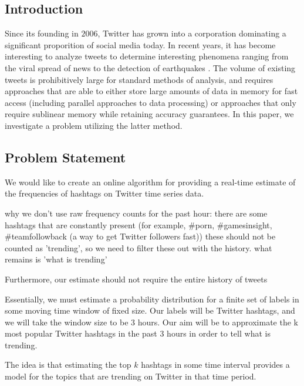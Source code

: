 \documentclass[twoside]{article}
\newcommand{\cc}[1]
 {\textbf{\cite{#1}}}
\begin{document}
\begin{multicols}{2} %

\section{Introduction} \label{sec:Intro}

Since its founding in $2006$, Twitter has grown into a corporation dominating a significant
proporition of social media today. In recent years, it has become interesting to analyze tweets
to determine interesting phenomena ranging from the viral spread of news to the detection of earthquakes \cc{Burks:2014}. The volume of existing tweets is prohibitively large for standard methods of analysis, and requires approaches that are able to either store large amounts of data in memory for fast access (including parallel approaches to data processing) or approaches that only require sublinear memory while retaining accuracy guarantees. In this paper, we investigate a problem utilizing the latter method. 

\subsection{Problem Statement} 

We would like to create an online algorithm for providing a real-time estimate of the frequencies of hashtags on Twitter time series data.

why we don't use raw frequency counts for the past hour:
there are some hashtags that are constantly present (for example, #porn, #gamesinsight, #teamfollowback (a way to get Twitter followers fast))
these should not be counted as 'trending', so we need to filter these out
with the history. what remains is 'what is trending'

Furthermore, our estimate should not require the entire history of tweets 

Essentially, we must estimate a probability distribution for a finite set of labels in some moving time window of fixed size. Our labels will be Twitter hashtags, and we will take the window size to be 3 hours.
Our aim will be to approximate the k most popular Twitter hashtags in the past 3 hours in order to tell what is trending.

The idea is that estimating the top $k$ hashtags in some time interval provides a model for the topics that are trending on Twitter in that time period.



\end{multicols}
\end{document}
